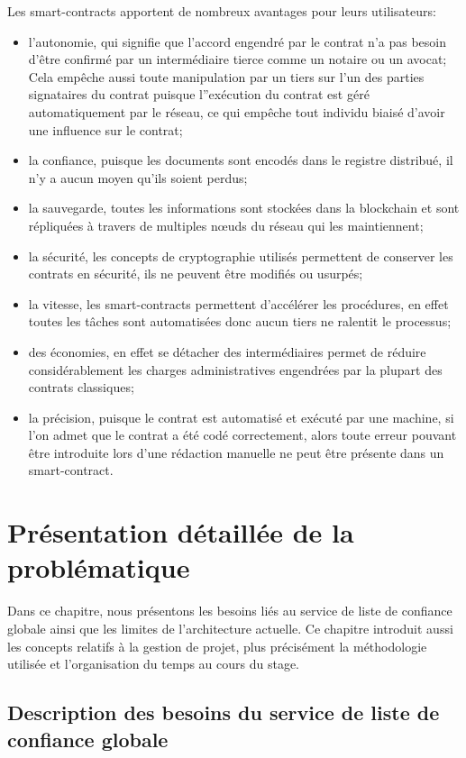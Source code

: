 \documentclass{tnreport}
\begin{document}
\clearpage
Les smart-contracts apportent de nombreux avantages pour leurs utilisateurs:
\begin{itemize}
	\item l'autonomie, qui signifie que l'accord engendré par le contrat n'a pas besoin d'être confirmé par un intermédiaire tierce comme un notaire ou un avocat; Cela empêche aussi toute manipulation par un tiers sur l'un des parties signataires du contrat puisque l''exécution du contrat est géré automatiquement par le réseau, ce qui empêche tout individu biaisé d'avoir une influence sur le contrat;
	\item la confiance, puisque les documents sont encodés dans le registre distribué, il n'y a aucun moyen qu'ils soient perdus;
	\item la sauvegarde, toutes les informations sont stockées dans la blockchain et sont répliquées à travers de multiples nœuds du réseau qui les maintiennent;
	\item la sécurité, les concepts de cryptographie utilisés permettent de conserver les contrats en sécurité, ils ne peuvent être modifiés ou usurpés;
	\item la vitesse, les smart-contracts permettent d'accélérer les procédures, en effet toutes les tâches sont automatisées donc aucun tiers ne ralentit le processus;
	\item des économies, en effet se détacher des intermédiaires permet de réduire considérablement les charges administratives engendrées par la plupart des contrats classiques;
	\item la précision, puisque le contrat est automatisé et exécuté par une machine, si l'on admet que le contrat a été codé correctement, alors toute erreur pouvant être introduite lors d'une rédaction manuelle ne peut être présente dans un smart-contract.
\end{itemize}

\chapter{Présentation détaillée de la problématique}
\label{chap:prob}

Dans ce chapitre, nous présentons les besoins liés au service de liste de confiance globale ainsi que les limites de l'architecture actuelle. Ce chapitre introduit aussi les concepts relatifs à la gestion de projet, plus précisément la méthodologie utilisée et l'organisation du temps au cours du stage.

\section{Description des besoins du service de liste de confiance globale}
\label{sec:description}
\end{document}

